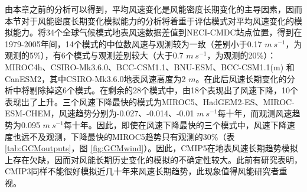 由本章之前的分析可以得到，平均风速变化是风能密度长期变化的主导因素，因而本节对于风能密度长期变化模拟能力的分析将着重于评估模式对平均风速变化的模拟能力。将34个全球气候模式地表风速数据差值到NECI-CMDC站点位置，得到在1979-2005年间，14个模式的中位数风速与观测较为一致（差别小于0.17 $m ~ s^{-1}$，为观测的5\%），有6个模式与观测差别较大（大于0.7 $m ~ s^{-1}$，为观测的20\%）：MIROC4h、CSIRO-Mk3.6.0、BCC-CSM1.1、BNU-ESM、BCC-CSM1.1(m) 和 CanESM2，其中CSIRO-Mk3.6.0地表风速高度为2 $m$。在此后风速长期变化的分析中将剔除掉这6个模式。在剩余的28个模式中，由18个表现出了风速下降，10个表现出了上升。三个风速下降最快的模式为MIROC5、HadGEM2-ES、MIROC-ESM-CHEM，风速趋势分别为-0.027、-0.014、-0.01 $m ~ s^{-1}$每十年，而观测风速趋势为0.095 $m ~ s^{-1}$每十年。因此，即使在风速下降最快的三个模式中，风速下降速度也远不及观测，下降最快的MIROC5趋势只有观测的30\%（表 \ref{tab:GCMoutputs}，图 \ref{fig:GCMwind}）。因此，CMIP5在地表风速长期趋势模拟上存在欠缺，因而对风能长期历史变化的模拟的不确定性较大。此前有研究表明，CMIP3同样不能很好模拟近几十年来风速长期趋势\citep{zongci2009evaluation}，此现象值得风能研究者重视。

